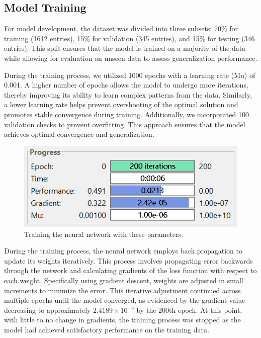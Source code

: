 \subsection{Model Training}
For model development, the dataset was divided into three subsets: 70\% for training (1612 entries), 15\% for validation (345 entries), and 15\% for testing (346 entries). This split ensures that the model is trained on a majority of the data while allowing for evaluation on unseen data to assess generalization performance.

During the training process, we utilized 1000 epochs with a learning rate (Mu) of 0.001. A higher number of epochs allows the model to undergo more iterations, thereby improving its ability to learn complex patterns from the data. Similarly, a lower learning rate helps prevent overshooting of the optimal solution and promotes stable convergence during training. Additionally, we incorporated 100 validation checks to prevent overfitting. This approach ensures that the model achieves optimal convergence and generalization.


\begin{figure}[!htpb]
    \centering
    \includegraphics[width=\linewidth]{Figures/testing.png}
    \caption{Training the neural network with these parameters.}
    \label{fig:tcanther}
\end{figure}

During the training process, the neural network employs back propagation to update its weights iteratively. This process involves propagating error backwards through the network and calculating gradients of the loss function with respect to each weight. Specifically using gradient descent, weights are adjusted in small increments to minimize the error. This iterative adjustment continued across multiple epochs until the model converged, as evidenced by the gradient value decreasing to approximately $2.4189 \times 10^{-5}$ by the 200th epoch. At this point, with little to no change in gradients, the training process was stopped as the model had achieved satisfactory performance on the training data.

